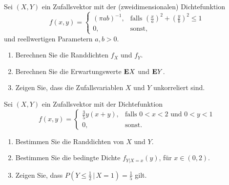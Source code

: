 Sei $(X,Y)$
ein Zufallsvektor mit der (zweidimensionalen) Dichtefunktion 
\begin{equation*}
    f(x,y) = \begin{cases}
        \left( \pi a b \right)^{-1}, & \text{falls } \left( \frac{x}{a} \right)^{2} + \left( \frac{y}{b} \right)^{2} \leq 1 \\
        0,& \text{sonst,}
    \end{cases}
\end{equation*}
und reellwertigen Parametern $a,b > 0$. 
\begin{enumerate}
    \item Berechnen Sie die Randdichten $f_{X}$ und $f_{Y}$.
    \item Berechnen Sie die Erwartungswerte $\mathbf{E} X$ und $\mathbf{E} Y$.
    \item Zeigen Sie, dass die Zufallsvariablen $X$ und $Y$ unkorreliert sind.
\end{enumerate}




 Sei $(X,Y)$ ein 
Zufallsvektor mit der Dichtefunktion
\begin{equation*}
    f(x,y) = \begin{cases}
        \frac{3}{5}y(x+y), & \text{falls } 0<x<2 \text{ und } 0<y<1 \\
        0,& \text{sonst.}
    \end{cases}
\end{equation*}
\begin{enumerate}
    \item Bestimmen Sie die Randdichten von $X$ und $Y$. 
    \item Bestimmen Sie die bedingte Dichte $f_{Y|X=x}(y)$, für $x\in (0,2)$. 
    \item Zeigen Sie, dass $P( Y \leq \frac{1}{2} \,|\, X=1) = \frac{1}{5}$ gilt.
\end{enumerate}

